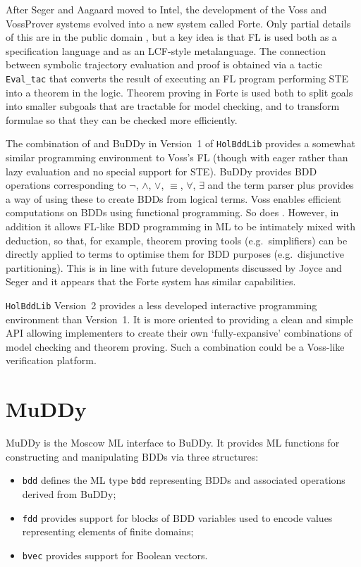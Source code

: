 \documentclass[12pt,fleqn]{article}
\renewcommand{\t}[1]{\mbox{\tt #1}}
\newcommand{\Buddy}{BuDDy{}}
\newcommand{\Muddy}{MuDDy{}}
\begin{document}
After Seger and Aagaard moved to Intel, the development of the Voss and
VossProver systems evolved into a new system called Forte.  Only partial details
of this are in the public domain
\cite{oleary-itj-99,aagaard-tphols-99}, but a key idea is that FL is
used both as a specification language and as an LCF-style
metalanguage. The connection between symbolic trajectory evaluation
and proof is obtained via a tactic {\tt{Eval\_tac}} that converts the
result of executing an FL program performing STE into a theorem in the
logic. Theorem proving in Forte is used both to split goals into
smaller subgoals that are tractable for model checking, and to
transform formulae so that they can be checked more efficiently.

The combination of \HOL{} and \Buddy{} in Version~1 of
{\tt{HolBddLib}} provides a somewhat similar programming environment
to Voss's FL (though with eager rather than lazy evaluation and no
special support for STE). \Buddy{} provides BDD operations
corresponding to $\neg$, $\wedge$, $\vee$, $\equiv$, $\forall$,
$\exists$ and the \HOL{} term parser plus  provides a
way of using these to create BDDs from logical terms.  Voss enables
efficient computations on BDDs using functional programming. So does
. However, in addition it allows FL-like BDD programming
in ML to be intimately mixed with \HOL{} deduction, so that, for
example, theorem proving tools (e.g.~simplifiers) can be directly
applied to terms to optimise them for BDD purposes (e.g.~disjunctive
partitioning).  This is in line with future developments discussed by
Joyce and Seger \cite{JoyceSeger} and it appears that the Forte system
has similar capabilities.

{\tt{HolBddLib}} Version~2 provides a less developed interactive
programming environment than Version~1. It is more oriented to
providing a clean and simple API allowing implementers to create their
own `fully-expansive' combinations of model checking and theorem
proving. Such a combination could be a Voss-like verification
platform.



\section{\Muddy}\label{muddy}

\Muddy{} is the Moscow ML interface to \Buddy{}. It provides ML functions for constructing and
manipulating BDDs via three structures:

\begin{itemize}

\item \t{bdd} defines the ML type
\t{bdd} representing BDDs and associated operations derived from \Buddy{};


\item \t{fdd} provides support for blocks of BDD variables
used to encode values representing elements of finite domains;

\item \t{bvec} provides support for Boolean vectors.

\end{itemize}
\end{document}
